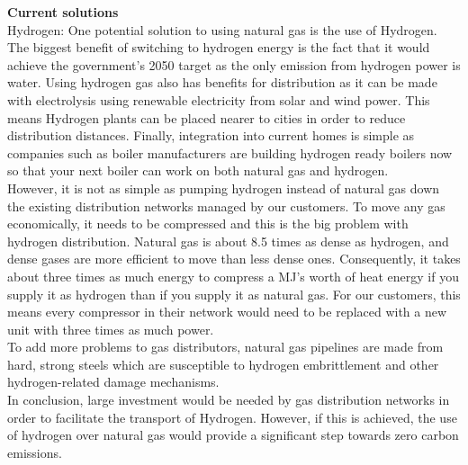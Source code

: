 \documentclass[11pt]{article}		%
\begin{document}
            \textbf{Current solutions}\\
            Hydrogen: One potential solution to using natural gas is the use of Hydrogen. The biggest benefit of switching to hydrogen energy is the fact that it would achieve the government's 2050 target as the only emission from hydrogen power is water. Using hydrogen gas also has benefits for distribution as it can be made with electrolysis using renewable electricity from solar and wind power. This means Hydrogen plants can be placed nearer to cities in order to reduce distribution distances. Finally, integration into current homes is simple as companies such as boiler manufacturers are building hydrogen ready boilers now so that your next boiler can work on both natural gas and hydrogen.\\
            \hspace*{3ex}However, it is not as simple as pumping hydrogen instead of natural gas down the existing distribution networks managed by our customers. To move any gas economically, it needs to be compressed and this is the big problem with hydrogen distribution. Natural gas is about 8.5 times as dense as hydrogen, and dense gases are more efficient to move than less dense ones. Consequently, it takes about three times as much energy to compress a MJ’s worth of heat energy if you supply it as hydrogen than if you supply it as natural gas. For our customers, this means every compressor in their network would need to be replaced with a new unit with three times as much power.\\
            \hspace*{3ex}To add more problems to gas distributors, natural gas pipelines are made from hard, strong steels which are susceptible to hydrogen embrittlement and other hydrogen-related damage mechanisms.\\
            \hspace*{3ex}In conclusion, large investment would be needed by gas distribution networks in order to facilitate the transport of Hydrogen. However, if this is achieved, the use of hydrogen over natural gas would provide a significant step towards zero carbon emissions.\\ 
            
\end{document}
